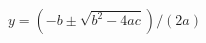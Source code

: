\documentclass[preview]{standalone}
\begin{document}
\begin{align*}
y = (-b \pm \sqrt{b^2 - 4ac})/(2a)
\end{align*}
\end{document}
